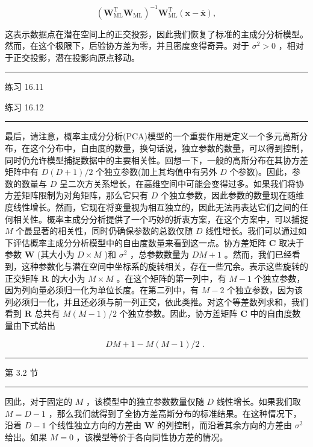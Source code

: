 \documentclass[10pt]{report}
\newcommand{\HRule}{\begin{center}\rule{0.9\linewidth}{0.2mm}\end{center}}
\begin{document}
\[
{\left( {\mathbf{W}}_{\mathrm{{ML}}}^{\mathrm{T}}{\mathbf{W}}_{\mathrm{{ML}}}\right) }^{-1}{\mathbf{W}}_{\mathrm{{ML}}}^{\mathrm{T}}\left( {\mathbf{x} - \overline{\mathbf{x}}}\right) , \tag{16.51}
\]

这表示数据点在潜在空间上的正交投影，因此我们恢复了标准的主成分分析模型。然而，在这个极限下，后验协方差为零，并且密度变得奇异。对于 \({\sigma }^{2} > 0\) ，相对于正交投影，潜在投影向原点移动。

\HRule

练习 16.11

练习 16.12

\HRule

最后，请注意，概率主成分分析(PCA)模型的一个重要作用是定义一个多元高斯分布，在这个分布中，自由度的数量，换句话说，独立参数的数量，可以得到控制，同时仍允许模型捕捉数据中的主要相关性。回想一下，一般的高斯分布在其协方差矩阵中有 \(D\left( {D + 1}\right) /2\) 个独立参数(加上其均值中有另外 \(D\) 个参数)。因此，参数的数量与 \(D\) 呈二次方关系增长，在高维空间中可能会变得过多。如果我们将协方差矩阵限制为对角矩阵，那么它只有 \(D\) 个独立参数，因此参数的数量现在随维度线性增长。然而，它现在将变量视为相互独立的，因此无法再表达它们之间的任何相关性。概率主成分分析提供了一个巧妙的折衷方案，在这个方案中，可以捕捉 \(M\) 个最显著的相关性，同时仍确保参数的总数仅随 \(D\) 线性增长。我们可以通过如下评估概率主成分分析模型中的自由度数量来看到这一点。协方差矩阵 \(\mathbf{C}\) 取决于参数 \(\mathbf{W}\) (其大小为 \(D \times  M\) )和 \({\sigma }^{2}\) ，总参数数量为 \({DM} + 1\) 。然而，我们已经看到，这种参数化与潜在空间中坐标系的旋转相关，存在一些冗余。表示这些旋转的正交矩阵 \(\mathbf{R}\) 的大小为 \(M \times  M\) 。在这个矩阵的第一列中，有 \(M - 1\) 个独立参数，因为列向量必须归一化为单位长度。在第二列中，有 \(M - 2\) 个独立参数，因为该列必须归一化，并且还必须与前一列正交，依此类推。对这个等差数列求和，我们看到 \(\mathbf{R}\) 总共有 \(M\left( {M - 1}\right) /2\) 个独立参数。因此，协方差矩阵 \(\mathbf{C}\) 中的自由度数量由下式给出

\[
{DM} + 1 - M\left( {M - 1}\right) /2\text{ . } \tag{16.52}
\]

\HRule

第 3.2 节

\HRule

因此，对于固定的 \(M\) ，该模型中的独立参数数量仅随 \(D\) 线性增长。如果我们取 \(M = D - 1\) ，那么我们就得到了全协方差高斯分布的标准结果。在这种情况下，沿着 \(D - 1\) 个线性独立方向的方差由 \(\mathbf{W}\) 的列控制，而沿着其余方向的方差由 \({\sigma }^{2}\) 给出。如果 \(M = 0\) ，该模型等价于各向同性协方差的情况。
\end{document}

